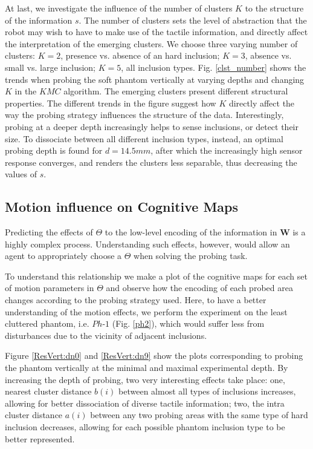 \documentclass[]{interact}
\theoremstyle{plain}%
\theoremstyle{definition}
\theoremstyle{remark}
\begin{document}
At last, we investigate the influence of the number of clusters $K$ to the structure of the information $s$. 
The number of clusters sets the level of abstraction that the robot may wish to have to make use of the tactile 
information, and directly affect the interpretation of the emerging clusters. We choose three 
varying number of clusters: $K=2$, presence vs. absence of an hard inclusion; $K=3$, absence vs. small vs. large 
inclusion; $K=5$, all inclusion types. Fig. \ref{clst_number} shows the trends when probing the soft phantom 
vertically at varying depths and changing $K$ in the $KMC$ algorithm. The emerging 
clusters present different structural properties. The different trends in the figure suggest how $K$ directly 
affect the way the probing strategy influences the structure of the data. Interestingly, 
probing at a deeper depth increasingly helps to sense inclusions, or detect their size. 
To dissociate between all different inclusion types, instead, an optimal probing depth is found for $d=14.5mm$, 
after which the increasingly high sensor response converges, and renders the clusters less separable, thus 
decreasing the values of $s$.


\subsection{Motion influence on Cognitive Maps}

Predicting the effects of $\Theta$ to the low-level encoding of the information in $\mathbf{W}$ is a 
highly complex process. Understanding such effects, however, would allow an agent to appropriately choose
 a $\Theta$ when solving the probing task.

To understand this relationship we make a plot of the cognitive maps for each set of motion parameters in $\Theta$ 
and observe how the encoding of each probed area changes according to the probing strategy used. Here, 
to have a better understanding of the motion effects, we perform the experiment on the least cluttered 
phantom, i.e. $Ph\text{-}1$ (Fig. \ref{ph2}), which would suffer less from disturbances due to the vicinity 
of adjacent inclusions. 

Figure \ref{ResVert:dn0} and \ref{ResVert:dn9} show the plots corresponding to probing the phantom 
vertically at the minimal and maximal experimental depth. By increasing the depth of probing, two very interesting 
effects take place: one, nearest cluster distance $b(i)$ between almost all types of inclusions increases, 
allowing for better dissociation of diverse tactile information; two, the intra cluster distance $a(i)$ 
between any two probing areas with the same type of hard inclusion decreases, allowing for each 
possible phantom inclusion type to be better represented. 
\end{document}

